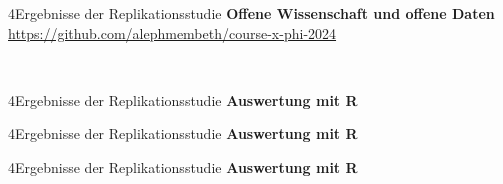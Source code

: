 \documentclass[xcolor=table,9pt,aspectratio=169]{beamer}
\begin{document}
\begin{frame}{\vspace*{10mm}4\hspace*{1em}Ergebnisse der Replikationsstudie}
\textbf{Offene Wissenschaft und offene Daten}\\
\smallskip
\url{https://github.com/alephmembeth/course-x-phi-2024}

\bigskip
\begin{center}
   \\
\end{center}
\end{frame}


\begin{frame}{\vspace*{10mm}4\hspace*{1em}Ergebnisse der Replikationsstudie}
\textbf{Auswertung mit R}\\
\smallskip
\lstset{style=mystyle}

\end{frame}


\begin{frame}{\vspace*{10mm}4\hspace*{1em}Ergebnisse der Replikationsstudie}
\textbf{Auswertung mit R}\\
\smallskip
\lstset{style=mystyle}

\end{frame}


\begin{frame}{\vspace*{10mm}4\hspace*{1em}Ergebnisse der Replikationsstudie}
\textbf{Auswertung mit R}\\
\smallskip
\lstset{style=mystyle}

\end{frame}
\end{document}
